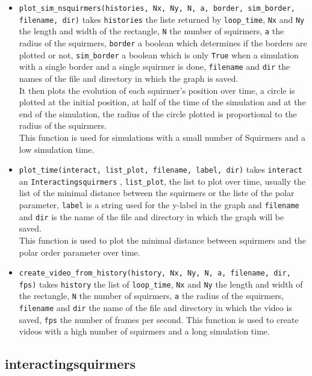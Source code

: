 \documentclass{article}
\begin{document}
\begin{itemize}
   \item \texttt{plot\_sim\_nsquirmers(histories, Nx, Ny, N, a, border, sim\_border, filename, dir)} takes \texttt{histories}
   the liste returned by \texttt{loop\_time}, \texttt{Nx} and 
   \texttt{Ny} the length and width of the rectangle, \texttt{N} the number of squirmers, \texttt{a} the radius of the squirmers,
   \texttt{border} a boolean which determines if the borders are plotted or not, \texttt{sim\_border} a boolean which is only \texttt{True}
    when a simulation with a single border and a single squirmer is done, \texttt{filename} and \texttt{dir} the names 
    of the file and directory in which the graph is saved.\\
   It then plots the evolution of each squirmer's position over time, a circle is plotted at the initial position, at
   half of the time of the simulation and at the end of the simulation,
   the radius of the circle plotted is proportional to the radius of the squirmers.\\
   This function is used for simulations with a small number of Squirmers and a low simulation time.
   \item \texttt{plot\_time(interact, list\_plot, filename, label, dir)} takes \texttt{interact} an \texttt{Interactingsquirmers}
   , \texttt{list\_plot}, the list to plot over time, usually the list of the minimal distance between the squirmers or the liste of the polar parameter,
   \texttt{label} is a string used for the y-label in the graph and \texttt{filename} and \texttt{dir} is the name of the file
    and directory in which the graph will be saved.\\
    This function is used to plot the minimal distance between squirmers and the polar order parameter over time.
   \item \texttt{create\_video\_from\_history(history, Nx, Ny, N, a, filename, dir, fps)} takes \texttt{history}
   the list of \texttt{loop\_time}, \texttt{Nx} and \texttt{Ny} the length and width of the rectangle,
   \texttt{N} the number of squirmers, \texttt{a} the radius of the squirmers, \texttt{filename} and \texttt{dir}
   the name of the file and directory in which the video is saved, \texttt{fps} the number of frames per second.
    This function is used to create videos with a high number of squirmers and a long simulation time.
\end{itemize}

\subsection{interactingsquirmers}
\end{document}
